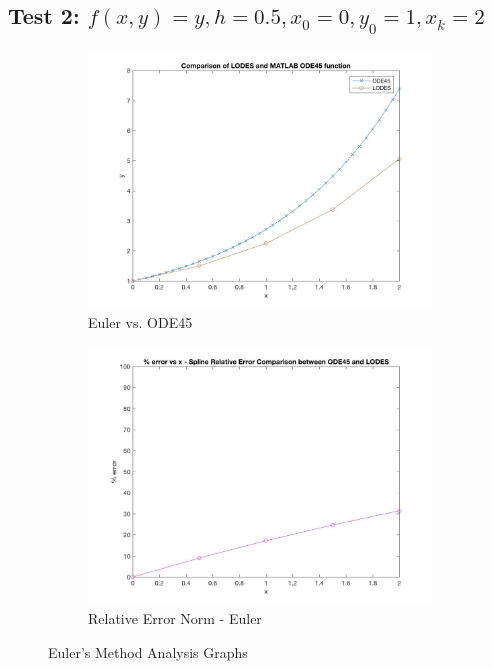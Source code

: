 \documentclass[12pt, titlepage]{article}
\begin{document}
\subsection{Test 2: $f(x,y) = y, h = 0.5,x_0 = 0,y_0 = 1,x_k = 2$} \label{sec_t2}
\begin{figure}[H]
\centering
\begin{subfigure}{.55\textwidth}
  \centering
  \includegraphics[width=\linewidth]{images/Test2/1LODESvsMATLABPlot.jpg}
  \caption{Euler vs. ODE45}
  \label{fig:euler2a}
\end{subfigure}%
\begin{subfigure}{.55\textwidth}
  \centering
  \includegraphics[width=\linewidth]{images/Test2/1RelativeErrorPlot.jpg}
  \caption{Relative Error Norm - Euler}
  \label{fig:euler2b}
\end{subfigure}
\caption{Euler's Method Analysis Graphs}
\label{fig:euler2}
\end{figure}
\end{document}
